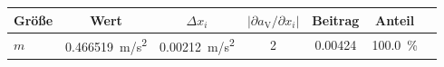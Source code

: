 \begin{tabular}{lcccccl}
\toprule
Größe & Wert & $\Delta x_i$ & $\left|\partial a_\mathrm{V}/\partial x_i\right|$ & Beitrag & Anteil &  \\
\midrule
$m$ & \qty{0.466519}{m/s^2} & \qty{0.00212}{m/s^2} & \num{2} & \num{0.00424} & \qty{100.0}{\percent} &  \\
\bottomrule
\end{tabular}
